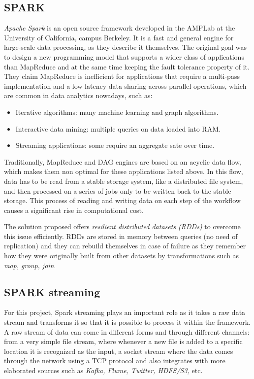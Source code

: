 \subsection{SPARK}

\textit{Apache Spark} is an open source framework developed in the AMPLab at the University of California, campus Berkeley\cite{SparkResearch}. It is a fast and general engine for large-scale data processing, as they describe it themselves. The original goal was to design a new programming model that supports a wider class of applications than MapReduce and at the same time keeping the fault tolerance property of it. They claim MapReduce is inefficient for applications that require a multi-pass implementation and a low latency data sharing across parallel operations, which are common in data analytics nowadays, such as: 

\begin{itemize}
 \item Iterative algorithms: many machine learning and graph algorithms.
 \item Interactive data mining: multiple queries on data loaded into RAM.
 \item Streaming applications: some require an aggregate sate over time.
\end{itemize}

Traditionally, MapReduce and DAG engines are based on an acyclic data flow, which makes them non optimal for these applications listed above. In this flow, data has to be read from a stable storage system, like a distributed file system, and then processed on a series of jobs only to be written back to the stable storage. This process of reading and writing data on each step of the workflow causes a significant rise in computational cost.

The solution proposed offers \textit{resilient distributed datasets (RDDs)} to overcome this issue efficiently. RDDs are stored in memory between queries (no need of replication) and they can rebuild themselves in case of failure as they remember how they were originally built from other datasets by transformations such as \textit{map, group, join}.

\subsection{SPARK streaming}

For this project, Spark streaming plays an important role as it takes a raw data stream and transforms it so that it is possible to process it within the framework. A raw stream of data can come in different forms and through different channels: from a very simple file stream, where whenever a new file is added to a specific location it is recognized as the input, a socket stream where the data comes through the network using a TCP protocol and also integrates with more elaborated sources such as \textit{Kafka, Flume, Twitter, HDFS/S3,} etc.


